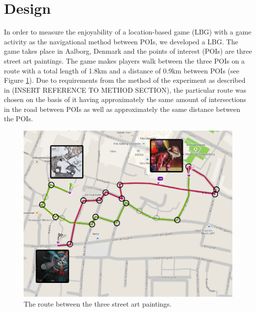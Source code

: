 \section{Design}
In order to measure the enjoyability of a location-based game (LBG) with a game activity as the navigational method between POIs, we developed a LBG. The game takes place in Aalborg, Denmark and the points of interest (POIs) are three street art paintings\cite{streetart}. The game makes players walk between the three POIs on a route with a total length of 1.8km and a distance of 0.9km between POIs (see Figure \ref{FinalRoute}). Due to requirements from the method of the experiment as described in (INSERT REFERENCE TO METHOD SECTION), the particular route was chosen on the basis of it having approximately the same amount of intersections in the road between POIs as well as approximately the same distance between the POIs.

\begin{figure}[hbtp]
\centering
\includegraphics[scale=0.2]{Pics/FinalRoute.png}
\caption{The route between the three street art paintings.}
\label{FinalRoute}
\end{figure}

